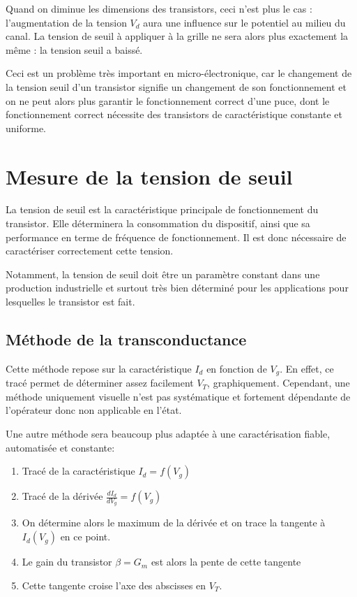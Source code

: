\documentclass[a4paper,11pt]{report}
\begin{document}
Quand on diminue les dimensions des transistors, ceci n'est plus le cas : l'augmentation de la tension $V_d$ aura une influence sur le potentiel au milieu du canal. La tension de seuil à appliquer à la grille ne sera alors plus exactement la même : la tension seuil a baissé. 

Ceci est un problème très important en micro-électronique, car le changement de la tension seuil d'un transistor signifie un changement de son fonctionnement et on ne peut alors plus garantir le fonctionnement correct d'une puce, dont le fonctionnement correct nécessite des transistors de caractéristique constante et uniforme.

\chapter{Mesure de la tension de seuil}
La tension de seuil est la caractéristique principale de fonctionnement du transistor. Elle déterminera la consommation du dispositif, ainsi que sa performance en terme de fréquence de fonctionnement. Il est donc nécessaire de caractériser correctement cette tension.

Notamment, la tension de seuil doit être un paramètre constant dans une production industrielle et surtout très bien déterminé pour les applications pour lesquelles le transistor est fait.

\section{Méthode de la transconductance}
Cette méthode repose sur la caractéristique $I_d$ en fonction de $V_g$. En effet, ce tracé permet de déterminer assez facilement $V_T$, graphiquement. Cependant, une méthode uniquement visuelle n'est pas systématique et fortement dépendante de l'opérateur donc non applicable en l'état.

Une autre méthode sera beaucoup plus adaptée à une caractérisation fiable, automatisée et constante:
\begin{enumerate}
    \item Tracé de la caractéristique $I_d = f(V_g)$
    \item Tracé de la dérivée $\frac{d I_d}{d V_g} = f(V_g)$
    \item On détermine alors le maximum de la dérivée et on trace la tangente à $I_d(V_g)$ en ce point.
    \item Le gain du transistor $\beta = G_m$ est alors la pente de cette tangente
    \item Cette tangente croise l'axe des abscisses en $V_T$.
\end{enumerate}
\end{document}
